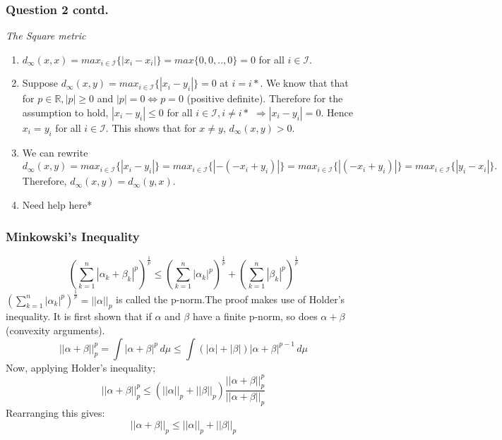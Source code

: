 \begin{frame}
\frametitle{Question 2 contd.}
\textit{The Square metric}\hfill\break
\begin{enumerate}
    \item $d_{\infty}(x,x) = max_{i\in \mathcal{I}}\{|x_i - x_i|\} = max\{0,
    0,..,0\} = 0$ for all $i\in \mathcal{I}.$
    \item Suppose $d_{\infty}(x,y) = max_{i\in \mathcal{I}}\{|x_i - y_i|\} = 0$
    at $i=i*$. We know that that for $p \in \mathbb{R}, |p|\geq 0$ and $|p| = 0
    \iff p = 0$ (positive definite). Therefore for the assumption to hold, $|x_i
    - y_i| \leq 0$ for all $i \in \mathcal{I}, i\neq i*$ $\Rightarrow |x_i -
    y_i| = 0$. Hence $x_i = y_i$ for all $i \in \mathcal{I}$. This shows that
    for $x\neq y$, $d_{\infty}(x,y)>0$.
    \item We can rewrite $d_{\infty}(x,y) = max_{i\in \mathcal{I}}\{|x_i -
    y_i|\} = max_{i\in \mathcal{I}}\{|- (- x_i + y_i)|\} = max_{i\in
    \mathcal{I}}\{|(- x_i + y_i)|\} = max_{i\in \mathcal{I}}\{|y_i - x_i|\}.$
    Therefore, $d_{\infty}(x,y) = d_{\infty}(y,x).$
    \item Need help here*
\end{enumerate}
\end{frame}

\begin{frame}
\frametitle{Minkowski's Inequality}
\begin{equation*}
    (\sum_{k=1}^{n}|\alpha_k+\beta_k|^p)^\frac{1}{p} \leq (\sum_{k=1}^{n}|\alpha_k|^p)^\frac{1}{p} + (\sum_{k=1}^{n}|\beta_k|^p)^\frac{1}{p}
\end{equation*}
$(\sum_{k=1}^{n}|\alpha_k|^p)^\frac{1}{p} = ||\alpha||_p$ is called the
p-norm.The proof makes use of Holder's inequality. It is first shown that if
$\alpha$ and $\beta$ have a finite p-norm, so does $\alpha+\beta$ (convexity
arguments).
\begin{equation*}
    ||\alpha+\beta||_p^p = \int |\alpha+\beta|^p \,d\mu \leq \int (|\alpha|+|\beta|)|\alpha+\beta|^{p-1} \,d\mu
\end{equation*}
Now, applying Holder's inequality;
\begin{equation}
||\alpha+\beta||_p^p \leq  (||\alpha||_p+||\beta||_p)\frac{||\alpha+\beta||_p^p}{||\alpha+\beta||_p}
\end{equation}
Rearranging this gives:
\begin{equation}
||\alpha+\beta||_p \leq  ||\alpha||_p+||\beta||_p
\end{equation}
\end{frame}

